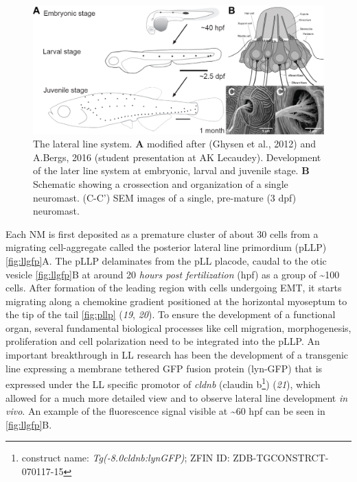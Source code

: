 \documentclass[11pt,singlespacinge,twoside]{reedthesis} %
\begin{document}
\begin{figure}

{\centering \includegraphics[width=.95\textwidth]{figures/intro/ll_system} 

}

\caption[The lateral line system]{The lateral line system. \textbf{A} modified after (Ghysen et al., 2012) and A.Bergs, 2016 (student presentation at AK Lecaudey). Development of the later line system at embryonic, larval and juvenile stage. \textbf{B} Schematic showing a crossection and organization of a single neuromast. (C-C') SEM images of a single, pre-mature (3 dpf) neuromast.}\label{fig:llsystem}
\end{figure}
Each NM is first deposited as a premature cluster of about 30 cells from a migrating cell-aggregate called the posterior lateral line primordium (pLLP) \ref{fig:llgfp}A. The pLLP delaminates from the pLL placode, caudal to the otic vesicle \ref{fig:llgfp}B at around 20 \emph{hours post fertilization} (hpf) as a group of \textasciitilde{}100 cells. After formation of the leading region with cells undergoing EMT, it starts migrating along a chemokine gradient positioned at the horizontal myoseptum to the tip of the tail \ref{fig:pllp} (\emph{19}, \emph{20}). To ensure the development of a functional organ, several fundamental biological processes like cell migration, morphogenesis, proliferation and cell polarization need to be integrated into the pLLP.
An important breakthrough in LL research has been the development of a transgenic line expressing a membrane tethered GFP fusion protein (lyn-GFP) that is expressed under the LL specific promotor of \emph{cldnb} (claudin b\footnote{construct name: \emph{Tg(-8.0cldnb:lynGFP)}; ZFIN ID: ZDB-TGCONSTRCT-070117-15}) (\emph{21}), which allowed for a much more detailed view and to observe lateral line development \emph{in vivo}. An example of the fluorescence signal visible at \textasciitilde{}60 hpf can be seen in \ref{fig:llgfp}B.
\end{document}

